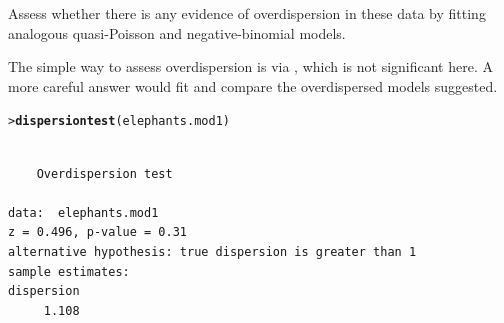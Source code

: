 \documentclass[10pt]{report}\usepackage[]{graphicx}\usepackage[]{color}
\makeatletter
\newcommand{\hlstd}[1]{\textcolor[rgb]{0.345,0.345,0.345}{#1}}%
\newcommand{\hlkwd}[1]{\textcolor[rgb]{0.737,0.353,0.396}{\textbf{#1}}}%
\newenvironment{kframe}{%
 \def\at@end@of@kframe{}%
 \ifinner\ifhmode%
  \def\at@end@of@kframe{\end{minipage}}%
  \begin{minipage}{\columnwidth}%
 \fi\fi%
 \def\FrameCommand##1{\hskip\@totalleftmargin \hskip-\fboxsep
 \colorbox{shadecolor}{##1}\hskip-\fboxsep
     \hskip-\linewidth \hskip-\@totalleftmargin \hskip\columnwidth}%
 \MakeFramed {\advance\hsize-\width
   \@totalleftmargin\z@ \linewidth\hsize
   \@setminipage}}%
 {\par\unskip\endMakeFramed%
 \at@end@of@kframe}
\newenvironment{knitrout}{}{} %
\renewenvironment{knitrout}{\small\renewcommand{\baselinestretch}{.85}}{} %
\makeatother
\begin{document}
\begin{Exercises}
\begin{enumerate*}
\begin{ans}
\begin{knitrout}
\end{knitrout}

    \end{ans}
    
    \item Assess whether there is any evidence of overdispersion in these data by fitting analogous
    quasi-Poisson and negative-binomial models.
    \begin{ans}
    The simple way to assess overdispersion is via , which is not significant here.
    A more careful answer would fit and compare the overdispersed models suggested.
\begin{knitrout}\footnotesize
{}\color{fgcolor}\begin{kframe}
\begin{alltt}
\hlstd{> }\hlkwd{dispersiontest}\hlstd{(elephants.mod1)}
\end{alltt}
\begin{verbatim}

	Overdispersion test

data:  elephants.mod1
z = 0.496, p-value = 0.31
alternative hypothesis: true dispersion is greater than 1
sample estimates:
dispersion 
     1.108 
\end{verbatim}
\end{kframe}
\end{knitrout}

    \end{ans}
    
  \end{enumerate*}


\end{Exercises}
\end{document}
